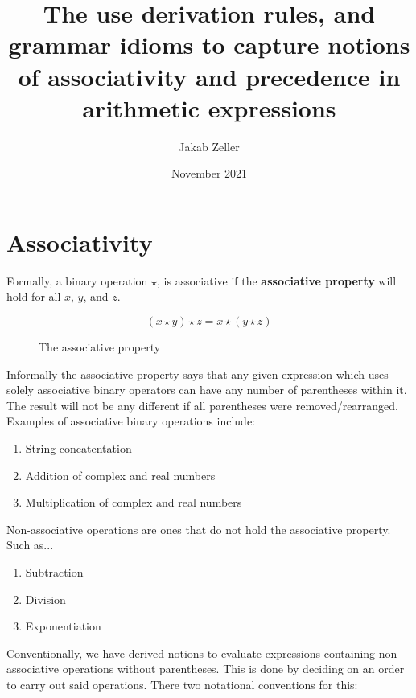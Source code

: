 \documentclass[12pt, letterpaper]{article}
\title{The use derivation rules, and grammar idioms to capture notions of associativity and precedence in arithmetic expressions}
\author{Jakab Zeller}
\date{November 2021}
\theoremstyle{definition}
\begin{document}
\maketitle

\section{Associativity}

Formally, a binary operation $\star$, is associative if the \textbf{associative property} will hold for all $x$, $y$, and $z$.

\begin{figure}[H]
    \begin{equation}
        (x \star y) \star z = x \star (y \star z)
        \nonumber
    \end{equation}
    \caption{\label{fig:4.1}The associative property}
\end{figure}

Informally the associative property says that any given expression which uses solely associative binary operators can have any number of parentheses within it. The result will not be any different if all parentheses were removed/rearranged. Examples of associative binary operations include:

\begin{enumerate}
    \item String concatentation
    \item Addition of complex and real numbers
    \item Multiplication of complex and real numbers
\end{enumerate}

Non-associative operations are ones that do not hold the associative property. Such as...

\begin{enumerate}
    \item Subtraction
    \item Division
    \item Exponentiation
\end{enumerate}

Conventionally, we have derived notions to evaluate expressions containing non-associative operations without parentheses. This is done by deciding on an order to carry out said operations. There two notational conventions for this:
\end{document}
